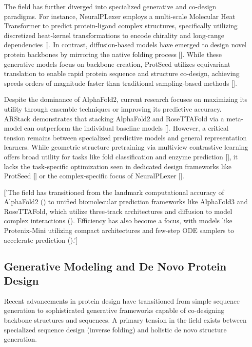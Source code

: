 \documentclass[11pt]{article}
\begin{document}
The field has further diverged into specialized generative and co-design paradigms. For instance, NeuralPLexer employs a multi-scale Molecular Heat Transformer to predict protein-ligand complex structures, specifically utilizing discretized heat-kernel transformations to encode chirality and long-range dependencies [\citep{2209.15171}]. In contrast, diffusion-based models have emerged to design novel protein backbones by mirroring the native folding process [\citep{2209.15611}]. While these generative models focus on backbone creation, ProtSeed utilizes equivariant translation to enable rapid protein sequence and structure co-design, achieving speeds orders of magnitude faster than traditional sampling-based methods [\citep{2210.08761}].

Despite the dominance of AlphaFold2, current research focuses on maximizing its utility through ensemble techniques or improving its predictive accuracy. ARStack demonstrates that stacking AlphaFold2 and RoseTTAFold via a meta-model can outperform the individual baseline models [\citep{2301.07568}]. However, a critical tension remains between specialized predictive models and general representation learners. While geometric structure pretraining via multiview contrastive learning offers broad utility for tasks like fold classification and enzyme prediction [\citep{2203.06125}], it lacks the task-specific optimization seen in dedicated design frameworks like ProtSeed [\citep{2210.08761}] or the complex-specific focus of NeuralPLexer [\citep{2209.15171}].

['The field has transitioned from the landmark computational accuracy of AlphaFold2 (\citep{2212.07702}) to unified biomolecular prediction frameworks like AlphaFold3 and RoseTTAFold, which utilize three-track architectures and diffusion to model complex interactions (\citep{2504.01490}). Efficiency has also become a focus, with models like Protenix-Mini utilizing compact architectures and few-step ODE samplers to accelerate prediction (\citep{2507.11839}).']
\subsection{Generative Modeling and De Novo Protein Design}

Recent advancements in protein design have transitioned from simple sequence generation to sophisticated generative frameworks capable of co-designing backbone structures and sequences. A primary tension in the field exists between specialized sequence design (inverse folding) and holistic de novo structure generation.
\end{document}
